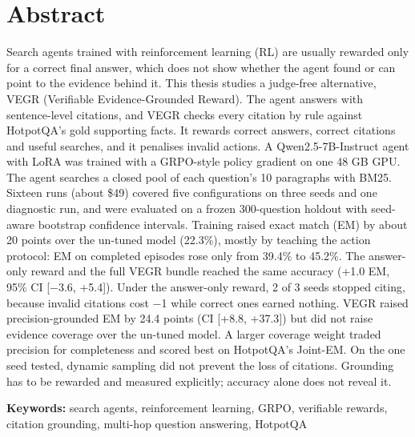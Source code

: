 \chapter*{Abstract}\label{abstract}

Search agents trained with reinforcement learning (RL) are usually
rewarded only for a correct final answer, which does not show whether
the agent found or can point to the evidence behind it. This thesis
studies a judge-free alternative, VEGR (Verifiable Evidence-Grounded
Reward). The agent answers with sentence-level citations, and VEGR
checks every citation by rule against HotpotQA's gold supporting facts.
It rewards correct answers, correct citations and useful searches, and
it penalises invalid actions. A Qwen2.5-7B-Instruct agent with LoRA was
trained with a GRPO-style policy gradient on one 48 GB GPU. The agent
searches a closed pool of each question's 10 paragraphs with BM25.
Sixteen runs (about \$49) covered five configurations on three seeds and
one diagnostic run, and were evaluated on a frozen 300-question holdout
with seed-aware bootstrap confidence intervals. Training raised exact
match (EM) by about 20 points over the un-tuned model (22.3\%), mostly
by teaching the action protocol: EM on completed episodes rose only from
39.4\% to 45.2\%. The answer-only reward and the full VEGR bundle
reached the same accuracy (+1.0 EM, 95\% CI {[}−3.6, +5.4{]}). Under the
answer-only reward, 2 of 3 seeds stopped citing, because invalid
citations cost −1 while correct ones earned nothing. VEGR raised
precision-grounded EM by 24.4 points (CI {[}+8.8, +37.3{]}) but did not
raise evidence coverage over the un-tuned model. A larger coverage
weight traded precision for completeness and scored best on HotpotQA's
Joint-EM. On the one seed tested, dynamic sampling did not prevent the
loss of citations. Grounding has to be rewarded and measured explicitly;
accuracy alone does not reveal it.

\textbf{Keywords:} search agents, reinforcement learning, GRPO,
verifiable rewards, citation grounding, multi-hop question answering,
HotpotQA
